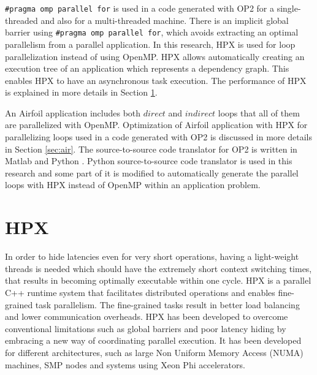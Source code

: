 \documentclass[conference]{IEEEtran}
\begin{document}
\texttt{\#pragma omp parallel for} is used in a code generated with OP2 for a single-threaded and also for a multi-threaded machine. There is an implicit global barrier using \texttt{\#pragma omp parallel for}, which avoids extracting an optimal parallelism from a parallel application. In this research, HPX is used for loop parallelization instead of using OpenMP.  HPX allows automatically creating an execution tree of an application which represents a dependency graph. This enables HPX to have an asynchronous task execution. The performance of HPX is explained in more details in Section \ref{sec:hpx}.                                                                                                                                                                                                                                                                                                                                                                                                                                                                                                                                                                                                                                                                                                                                                                                                                            


An Airfoil application includes both $direct$ and $indirect$ loops that all of them are parallelized with OpenMP. Optimization of Airfoil application with HPX for parallelizing loops used in a code generated with OP2 is discussed in more details in Section \ref{sec:air}. The source-to-source code translator for OP2 is written in Matlab and Python \cite{o3}. Python source-to-source code translator is used in this research and some part of it is modified to automatically generate the parallel loops with HPX instead of OpenMP within an application problem. 


\section{HPX}
\label{sec:hpx}

In order to hide latencies even for very short operations, having a light-weight threads is needed which should have the extremely short context switching times, that results in becoming optimally executable within one cycle. HPX is a parallel C++ runtime system that facilitates distributed operations and enables fine-grained task parallelism. The fine-grained tasks result in better load balancing and lower communication overheads. HPX has been developed  to overcome conventional limitations such as global barriers and poor latency hiding \cite{r6} by embracing a new way of coordinating parallel execution. It has been developed for different architectures, such as large Non Uniform Memory Access (NUMA) machines, SMP nodes and systems using Xeon Phi accelerators.
\end{document}
